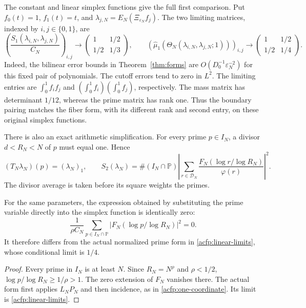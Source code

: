 The constant and linear simplex functions give the full first comparison.
Put $f_0(t)=1$, $f_1(t)=t$, and
$\lambda_{j,N}=E_N(\Xi_{\varepsilon_N}f_j)$.
The two limiting matrices, indexed by $i,j\in\{0,1\}$, are
\begin{equation}\label{acfp:first-matrices}
 \left(\frac{S_1(\lambda_{i,N},\lambda_{j,N})}{C_N}\right)_{i,j}
 \longrightarrow
 \begin{pmatrix}1&1/2\\1/2&1/3\end{pmatrix},\qquad
 \left(\widehat\mu_1(\Theta_N(\lambda_{i,N},\lambda_{j,N};1))\right)_{i,j}
 \longrightarrow
 \begin{pmatrix}1&1/2\\1/2&1/4\end{pmatrix}.
\end{equation}
Indeed, the bilinear error bounds in Theorem~\ref{thm:forms} are
$O(D_0^{-1}\varepsilon_N^{-2})$ for this fixed pair of polynomials.
The cutoff errors tend to zero in $L^2$.
The limiting entries are
$\int_0^1 f_if_j$ and $(\int_0^1f_i)(\int_0^1f_j)$, respectively.
The mass matrix has determinant $1/12$, whereas the prime matrix has rank one.
Thus the boundary pairing matches the fiber form, with its different rank
and second entry, on these original simplex functions.

There is also an exact arithmetic simplification.
For every prime $p\in I_N$, a divisor $d<R_N<N$ of $p$ must equal one.
Hence
\begin{equation}\label{acfp:one-coordinate}
 (T_N\lambda_N)(p)=(\lambda_N)_1,\qquad
 S_2(\lambda_N)
    =\#(I_N\cap\mathbb P)\left|
       \sum_{r\in\mathcal D_N}\frac{F_N(\log r/\log R_N)}{\varphi(r)}
                         \right|^2.
\end{equation}
The divisor average is taken before its square weights the primes.

\begin{proposition}\label{acfp:substitution}
For the same parameters, the expression obtained by substituting the
prime variable directly into the simplex function is identically zero:
\[
 \frac1{\rho C_N}\sum_{p\in I_N\cap\mathbb P}
                |F_N(\log p/\log R_N)|^2=0.
\]
It therefore differs from the actual normalized prime form in
\eqref{acfp:linear-limits}, whose conditional limit is $1/4$.
\end{proposition}

\begin{proof}
Every prime in $I_N$ is at least $N$.
Since $R_N=N^\rho$ and $\rho<1/2$,
$\log p/\log R_N\geq1/\rho>1$.
The zero extension of $F_N$ vanishes there.
The actual form first applies $L_NP_N$ and then incidence, as in
\eqref{acfp:one-coordinate}.  Its limit is \eqref{acfp:linear-limits}.
\end{proof}

